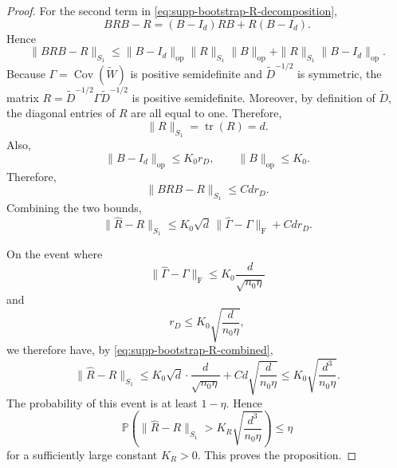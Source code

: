 \documentclass[
  12pt]{article}
\theoremstyle{plain}
\theoremstyle{definition}
\theoremstyle{remark}
\begin{document}
\begin{proof}
For the second term in \eqref{eq:supp-bootstrap-R-decomposition},
\[
BRB-R
=
(B-I_d)RB+R(B-I_d).
\]
Hence
\[
\|BRB-R\|_{S_1}
\le
\|B-I_d\|_{\mathrm{op}}\|R\|_{S_1}\|B\|_{\mathrm{op}}
+
\|R\|_{S_1}\|B-I_d\|_{\mathrm{op}}.
\]
Because \(\Gamma=\operatorname{Cov}(\widetilde W)\) is positive semidefinite
and \(\widetilde D^{-1/2}\) is symmetric, the matrix
\(R=\widetilde D^{-1/2}\Gamma\widetilde D^{-1/2}\) is positive semidefinite.
Moreover, by definition of \(\widetilde D\), the diagonal entries of \(R\) are
all equal to one. Therefore,
\[
\|R\|_{S_1}=\operatorname{tr}(R)=d.
\]
Also,
\[
\|B-I_d\|_{\mathrm{op}}\le K_0r_D,
\qquad
\|B\|_{\mathrm{op}}\le K_0.
\]
Therefore,
\[
\|BRB-R\|_{S_1}
\le
Cd r_D.
\]
Combining the two bounds,
\begin{equation}
\label{eq:supp-bootstrap-R-combined}
\|\widehat R-R\|_{S_1}
\le
K_0\sqrt d\,\|\widehat\Gamma-\Gamma\|_{\mathrm F}
+
Cd r_D.
\end{equation}

On the event where
\[
\|\widehat\Gamma-\Gamma\|_{\mathrm F}
\le
K_0\frac d{\sqrt{n_0\eta}}
\]
and
\[
r_D\le K_0\sqrt{\frac d{n_0\eta}},
\]
we therefore have, by \eqref{eq:supp-bootstrap-R-combined},
\[
\|\widehat R-R\|_{S_1}
\le
K_0\sqrt d\cdot \frac d{\sqrt{n_0\eta}}
+
Cd\sqrt{\frac d{n_0\eta}}
\le
K_0\sqrt{\frac{d^3}{n_0\eta}}.
\]
The probability of this event is at least \(1-\eta\). Hence
\[
\mathbb P
\left(
\|\widehat R-R\|_{S_1}
>
K_R\sqrt{\frac{d^3}{n_0\eta}}
\right)
\le
\eta
\]
for a sufficiently large constant \(K_R>0\). This proves the proposition.
\end{proof}
\end{document}
